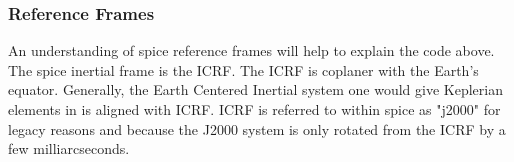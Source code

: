 \subsubsection{Reference Frames}
An understanding of spice reference frames will help to explain the code above. The spice inertial frame is the ICRF. The ICRF is coplaner with the Earth's equator. Generally, the Earth Centered Inertial system one would give Keplerian elements in is aligned with ICRF. ICRF is referred to within spice as "j2000" for legacy reasons and because the J2000 system is only rotated from the ICRF by a few milliarcseconds.

